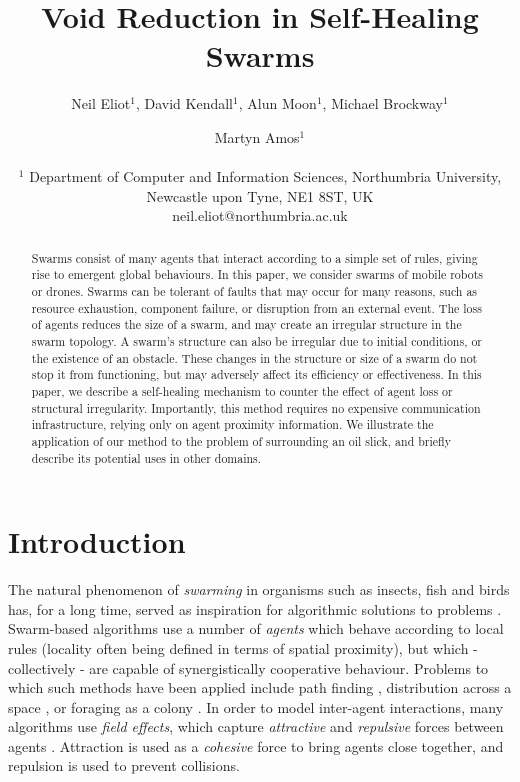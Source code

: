 \documentclass[letterpaper]{article}
\title{Void Reduction in Self-Healing Swarms}
\author{Neil Eliot$^{1}$, David Kendall$^{1}$, Alun Moon$^{1}$,  Michael Brockway$^{1}$ \and Martyn Amos$^{1}$ \\
\mbox{} \\
$^1$ Department of Computer and Information Sciences, Northumbria University, Newcastle upon Tyne, NE1 8ST, UK \\
neil.eliot@northumbria.ac.uk} %
\begin{document}
\maketitle

\begin{abstract}

Swarms consist of many agents that interact according to a simple set of rules, giving rise to emergent global behaviours. In this paper, we consider swarms of mobile robots or drones. Swarms can be tolerant of faults that may occur for many reasons, such as resource exhaustion, component failure, or disruption from an external event. The loss of agents reduces the size of a swarm, and may create an irregular structure in the swarm topology. A swarm's structure can also be irregular due to initial conditions, or the existence of an obstacle. These changes in the structure or size of a swarm do not stop it from functioning, but may adversely affect its efficiency or effectiveness. In this paper, we describe a self-healing mechanism to counter the effect of agent loss or structural irregularity. Importantly, this method requires no expensive communication infrastructure, relying only on agent proximity information. We illustrate the application of our method to the problem of surrounding an oil slick, and briefly describe its potential uses in other domains.
\end{abstract}

\section{Introduction}
\label{sec:ConcaveReduction}

The natural phenomenon of {\it swarming} in organisms such as insects, fish and birds has, for a long time, served as inspiration for algorithmic solutions to problems \cite{blummerkle}.
Swarm-based algorithms use a number of {\it agents} which behave according to local rules (locality often being defined in terms of spatial proximity), but which - collectively - are capable of synergistically cooperative behaviour. Problems to which such methods have been applied include path finding \cite{HCS:09}, distribution across a space \cite{EP:10, GP:02, GP:04}, or foraging as a colony \cite{GK:07, HER:11}. In order to model inter-agent interactions, many algorithms use {\em field effects}, which capture {\it attractive} and {\it repulsive} forces between agents \cite{APZDAMC:09, BAFVM:06, BAF:06,  BM:09, GP:02, GP:04a, GP:05, GP:11, MYP:09}.  Attraction is used as a {\it cohesive} force to bring agents close together, and repulsion is used to prevent collisions. 
\end{document}
